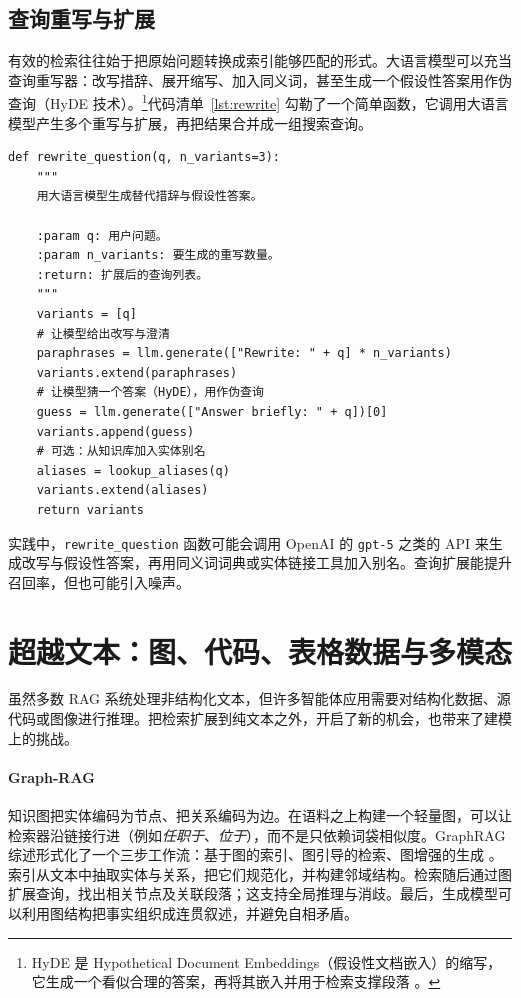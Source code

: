 \subsection{查询重写与扩展}

有效的检索往往始于把原始问题转换成索引能够匹配的形式。大语言模型可以充当查询重写器：改写措辞、展开缩写、加入同义词，甚至生成一个假设性答案用作伪查询（HyDE 技术）。\footnote{HyDE 是 Hypothetical Document Embeddings（假设性文档嵌入）的缩写，它生成一个看似合理的答案，再将其嵌入并用于检索支撑段落 \citep{gao2023hyde}。}代码清单~\ref{lst:rewrite} 勾勒了一个简单函数，它调用大语言模型产生多个重写与扩展，再把结果合并成一组搜索查询。


\begin{listing}[!ht]
\begin{verbatim}
def rewrite_question(q, n_variants=3):
    """
    用大语言模型生成替代措辞与假设性答案。

    :param q: 用户问题。
    :param n_variants: 要生成的重写数量。
    :return: 扩展后的查询列表。
    """
    variants = [q]
    # 让模型给出改写与澄清
    paraphrases = llm.generate(["Rewrite: " + q] * n_variants)
    variants.extend(paraphrases)
    # 让模型猜一个答案（HyDE），用作伪查询
    guess = llm.generate(["Answer briefly: " + q])[0]
    variants.append(guess)
    # 可选：从知识库加入实体别名
    aliases = lookup_aliases(q)
    variants.extend(aliases)
    return variants
\end{verbatim}
\caption{查询重写的一个简单示例}
\label{lst:rewrite}
\end{listing}


实践中，\texttt{rewrite\_question} 函数可能会调用 OpenAI 的 \texttt{gpt-5} 之类的 API 来生成改写与假设性答案，再用同义词词典或实体链接工具加入别名。查询扩展能提升召回率，但也可能引入噪声。




\section[图、代码、表格数据]{超越文本：图、代码、表格数据与多模态}
虽然多数 RAG 系统处理非结构化文本，但许多智能体应用需要对结构化数据、源代码或图像进行推理。把检索扩展到纯文本之外，开启了新的机会，也带来了建模上的挑战。

\paragraph{Graph-RAG}  知识图把实体编码为节点、把关系编码为边。在语料之上构建一个轻量图，可以让检索器沿链接行进（例如{\em 任职于}、{\em 位于}），而不是只依赖词袋相似度。GraphRAG 综述形式化了一个三步工作流：基于图的索引、图引导的检索、图增强的生成 \citep{peng2024graphrag_survey}。索引从文本中抽取实体与关系，把它们规范化，并构建邻域结构。检索随后通过图扩展查询，找出相关节点及关联段落；这支持全局推理与消歧。最后，生成模型可以利用图结构把事实组织成连贯叙述，并避免自相矛盾。


